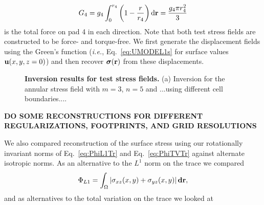 \documentclass[aps,prl,reprint,twocolumn,groupedaddress,showpacs]{revtex4-1}
\newcommand{\bsigma}{{\boldsymbol\sigma}}
\def\d{{\bf d}}
\def\dd{\mbox{d}}
\def\r{{\bf r}}
\def\u{{\bf u}}
\begin{document}
\begin{equation}
G_{4} = g_{4}\int_{0}^{r_{4}}\left(1-{r\over r_{4}}\right) \dd \r = {g_{4}\pi r_{4}^{2}\over 3}
\end{equation}
%
is the total force on pad 4 in each direction. Note that both test
stress fields are constructed to be force- and torque-free. We first
generate the displacement fields using the Green's function 
(\textit{i.e.}, Eq.~\ref{eq:UMODEL1s} for surface values $\u(x,y,z=0)$)
and then recover $\bsigma(\r)$ from these displacements.

\begin{figure}[t]
\begin{center}
%
\caption{\textbf{Inversion results for test stress fields.} (a)
  Inversion for the annular stress field with $m=3$, $n=5$ and
  ...using different cell boundaries.... }
\label{RESULTS_TEST}
\end{center}
\end{figure}

\vspace{1cm}
{\bf DO SOME RECONSTRUCTIONS FOR DIFFERENT REGULARIZATIONS, FOOTPRINTS, AND GRID RESOLUTIONS}
\vspace{1cm}

We also compared reconstruction of the surface stress using our
rotationally invariant norms of Eq.~\ref{eq:PhiL1Tr} and
Eq.~\ref{eq:PhiTVTr} against alternate isotropic norms. As an
alternative to the $L^1$ norm on the trace we compared
\begin{equation}
\Phi_{L1} = \int_\Omega \left\vert \sigma_{xz}(x,y) +\sigma_{yz}(x,y) \right\vert\d\r,
\end{equation} 
and as alternatives to the total variation on the trace we looked at
\end{document}

